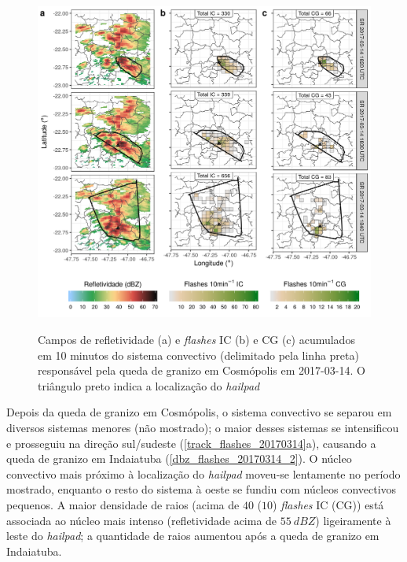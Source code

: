 \begin{figure}[htb]
	\centering
	\caption{Campos de refletividade (a) e \textit{flashes} IC (b) e CG (c) acumulados em 10 minutos do sistema convectivo (delimitado pela linha preta) responsável pela queda de granizo em Cosmópolis em 2017-03-14. O triângulo preto indica a localização do \textit{hailpad}} 
	\label{dbz_flashes_20170314_1}
	\includegraphics[width=0.99\columnwidth]{../General_Processing/figures/clusters_flashes_2017-03-14_1830_ptbr.png} \\
\end{figure}

Depois da queda de granizo em Cosmópolis, o sistema convectivo se separou em diversos sistemas menores (não mostrado); o maior desses sistemas se intensificou e prosseguiu na direção sul/sudeste (\autoref{track_flashes_20170314}a), causando a queda de granizo em Indaiatuba (\autoref{dbz_flashes_20170314_2}). O núcleo convectivo mais próximo à localização do \textit{hailpad} moveu-se lentamente no período mostrado, enquanto o resto do sistema à oeste se fundiu com núcleos convectivos pequenos. A maior densidade de raios (acima de $40$ ($10$) \textit{flashes} IC (CG)) está associada ao núcleo mais intenso (refletividade acima de $55\:dBZ$) ligeiramente à leste do \textit{hailpad}; a quantidade de raios aumentou após a queda de granizo em Indaiatuba. 

